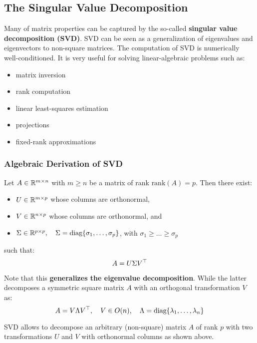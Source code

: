 \subsection{The Singular Value Decomposition}%
\label{sub:the_singular_value_decomposition}

Many of matrix properties can be captured by the so-called
\textbf{singular value decomposition (SVD)}.
SVD can be seen as a generalization of eigenvalues and
eigenvectors to non-square matrices.
The computation of SVD is numerically well-conditioned.
It is very useful for solving linear-algebraic problems such as:
\begin{itemize}
	\setlength\itemsep{-0.2em}
	\item matrix inversion
	\item rank computation
	\item linear least-squares estimation
	\item projections
	\item fixed-rank approximations
\end{itemize}


\subsubsection{Algebraic Derivation of SVD}%
\label{ssub:algebraic_derivation_of_svd}

Let $A \in \mathbb{R}^{m \times{} n}$ with $m \ge n$ be a matrix of rank
$\text{rank}(A) = p$. Then there exist:
\begin{itemize}
	\item $U \in \mathbb{R}^{m \times{} p}$ whose columns are orthonormal,
	\item $V \in \mathbb{R}^{n \times{} p}$ whose columns are orthonormal, and
	\item $\Sigma \in \mathbb{R}^{p \times{} p}, \quad
		\Sigma = \text{diag}\{ \sigma_1, \ldots, \sigma_p \}$, with
		$\sigma_1 \ge \ldots \ge \sigma_p$
\end{itemize}
such that:
	\[A = U \Sigma V^{\top}\]

Note that this \textbf{generalizes the eigenvalue decomposition}.
While the latter decomposes a symmetric square matrix $A$ with
an orthogonal transformation $V$ as:
\[A = V \Lambda V^{\top}, \quad V \in O(n), \quad
\Lambda = \text{diag}\{\lambda_1, \ldots, \lambda_n\}\]

SVD allows to decompose an arbitrary (non-square) matrix $A$
of rank $p$ with two transformations $U$ and $V$ with orthonormal
columns as shown above.\\

